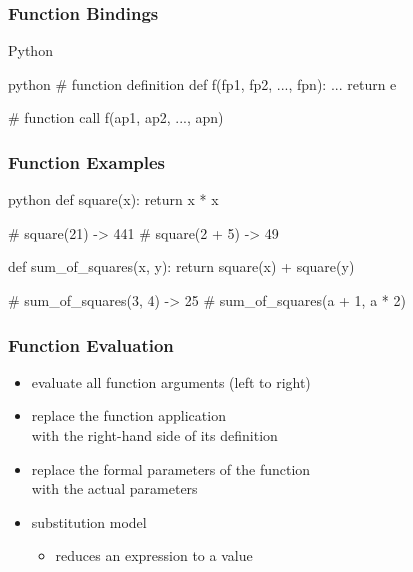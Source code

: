 \documentclass[dvipsnames]{beamer}
\theoremstyle{plain}
\begin{document}
\begin{frame}[fragile]
  \frametitle{Function Bindings}

  \begin{block}{Python}
    \begin{pygments}{python}
# function definition
def f(fp1, fp2, ..., fpn):
    ...
    return e

# function call
f(ap1, ap2, ..., apn)
    \end{pygments}
  \end{block}
\end{frame}

\begin{frame}[fragile]
  \frametitle{Function Examples}

  \begin{example}[Python]
    \begin{pygments}{python}
def square(x):
    return x * x

# square(21) -> 441
# square(2 + 5) -> 49

def sum_of_squares(x, y):
    return square(x) + square(y)

# sum_of_squares(3, 4) -> 25
# sum_of_squares(a + 1, a * 2)
    \end{pygments}
  \end{example}
\end{frame}

\begin{frame}
  \frametitle{Function Evaluation}

  \begin{itemize}
    \item evaluate all function arguments (left to right)
    \item replace the function application\\
      with the right-hand side of its definition
    \item replace the formal parameters of the function\\
      with the actual parameters

    \pause
    \bigskip
    \item \alert{substitution model}
    \begin{itemize}
      \item reduces an expression to a value
    \end{itemize}
  \end{itemize}
\end{frame}
\end{document}
